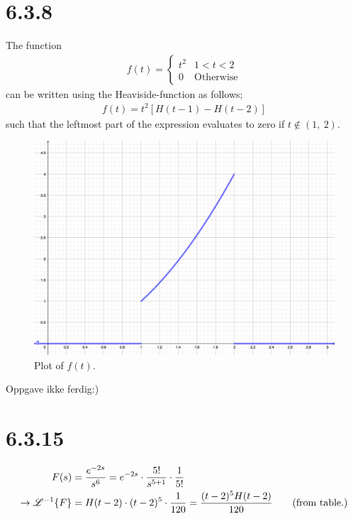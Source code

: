 \documentclass[11pt,a4paper]{article}
\newcommand{\Laplace}{\mathscr{L}}
\begin{document}
\newpage
\section*{6.3.8}
The function
\begin{align*}
	f(t) = 
	\left\{\begin{matrix}
	t^2 & 1 < t < 2 \\ 
	0 & \text{Otherwise}
	\end{matrix}\right.
\end{align*}
can be written using the Heaviside-function as follows;
\begin{align*}
	f(t) = t^2 [H(t-1) - H(t-2)]
\end{align*}
such that the leftmost part of the expression evaluates to zero if $t \notin (1,\ 2)$.
\begin{figure}[h!]
	\centering
	\includegraphics[scale=3]{../figure_6_3_8.png}
	\caption{Plot of $f(t)$.}
\end{figure}
Oppgave ikke ferdig:)

\section*{6.3.15}
\begin{align*}
	F(s) 
	&= \frac{e^{-2s}}{s^6} 
	= e^{-2s} \cdot \frac{5!}{s^{5+1}} \cdot \frac{1}{5!} \\
	\rightarrow \Laplace^{-1}\{F\}
	&= H(t-2) \cdot (t-2)^5 \cdot \frac{1}{120}
	= \frac{(t-2)^5 H(t-2)}{120}
	\hspace*{.7cm} \text{(from table.)}
\end{align*}

\newpage
\end{document}
